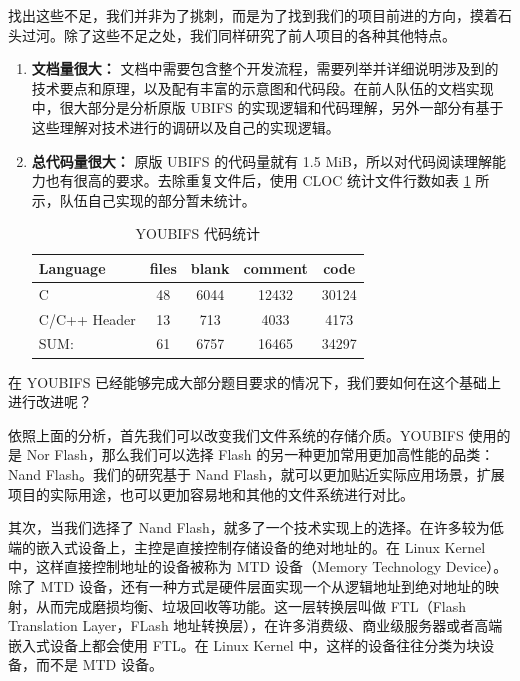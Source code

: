 找出这些不足，我们并非为了挑刺，而是为了找到我们的项目前进的方向，摸着石头过河。除了这些不足之处，我们同样研究了前人项目的各种其他特点。

\begin{enumerate}
  \item {\bf{文档量很大：}} 文档中需要包含整个开发流程，需要列举并详细说明涉及到的技术要点和原理，以及配有丰富的示意图和代码段。在前人队伍的文档实现中，很大部分是分析原版 UBIFS 的实现逻辑和代码理解，另外一部分有基于这些理解对技术进行的调研以及自己的实现逻辑。  

  \item {\bf{总代码量很大：}} 原版 UBIFS 的代码量就有 1.5 MiB，所以对代码阅读理解能力也有很高的要求。去除重复文件后，使用 CLOC 统计文件行数如表 \ref{youbifs_code} 所示，队伍自己实现的部分暂未统计。

  \begin{table}
    \centering
      \begin{tabular}{lcccc}
        \textbf{Language} & \textbf{files} & \textbf{blank} & \textbf{comment} & \textbf{code} \\
        \hline
        C & 48 & 6044 & 12432 & 30124 \\
        C/C++ Header & 13 & 713 & 4033 & 4173 \\
        \hline
        SUM: & 61 & 6757 & 16465 & 34297 \\
      \end{tabular}
      \caption{YOUBIFS 代码统计}
      \label{youbifs_code}
  \end{table}
  
\end{enumerate}

在 YOUBIFS 已经能够完成大部分题目要求的情况下，我们要如何在这个基础上进行改进呢？

依照上面的分析，首先我们可以改变我们文件系统的存储介质。YOUBIFS 使用的是 Nor Flash，那么我们可以选择 Flash 的另一种更加常用更加高性能的品类：Nand Flash。我们的研究基于 Nand Flash，就可以更加贴近实际应用场景，扩展项目的实际用途，也可以更加容易地和其他的文件系统进行对比。

其次，当我们选择了 Nand Flash，就多了一个技术实现上的选择。在许多较为低端的嵌入式设备上，主控是直接控制存储设备的绝对地址的。在 Linux Kernel 中，这样直接控制地址的设备被称为 MTD 设备（Memory Technology Device）。
除了 MTD 设备，还有一种方式是硬件层面实现一个从逻辑地址到绝对地址的映射，从而完成磨损均衡、垃圾回收等功能。这一层转换层叫做 FTL（Flash Translation Layer，FLash 地址转换层），在许多消费级、商业级服务器或者高端嵌入式设备上都会使用 FTL。在 Linux Kernel 中，这样的设备往往分类为块设备，而不是 MTD 设备。

